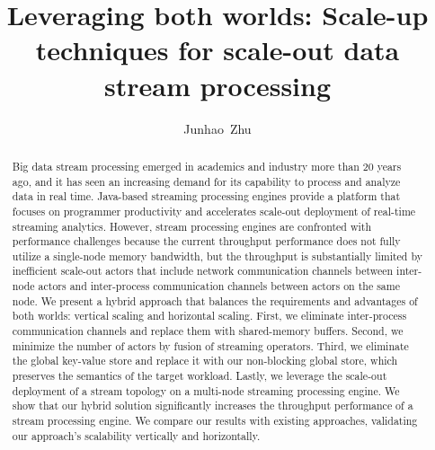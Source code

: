 \documentclass[runningheads]{llncs}
\begin{document}
%
\title{Leveraging both worlds: Scale-up techniques for scale-out data stream
processing}
%
%
\author{Junhao~Zhu}
%
%
%
\maketitle              %
%
\begin{abstract}
Big data stream processing emerged in academics and industry more than 20 years
ago, and it has seen an increasing demand for its capability to process and
analyze data in real time. Java-based streaming processing engines provide a
platform that focuses on programmer productivity and accelerates scale-out
deployment of real-time streaming analytics. However, stream processing engines
are confronted with performance challenges because the current throughput
performance does not fully utilize a single-node memory bandwidth, but the
throughput is substantially limited by inefficient scale-out actors that
include network communication channels between inter-node actors and
inter-process communication channels between actors on the same node. We
present a hybrid approach that balances the requirements and advantages of both
worlds: vertical scaling and horizontal scaling. First, we eliminate
inter-process communication channels and replace them with shared-memory
buffers. Second, we minimize the number of actors by fusion of streaming
operators. Third, we eliminate the global key-value store and replace it with
our non-blocking global store, which preserves the semantics of the target
workload. Lastly, we leverage the scale-out deployment of a stream topology on
a multi-node streaming processing engine. We show that our hybrid solution
significantly increases the throughput performance of a stream processing
engine. We compare our results with existing approaches, validating our
approach's scalability vertically and horizontally.

\end{abstract}
%
%
%
\end{document}
